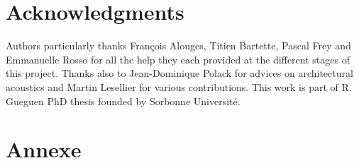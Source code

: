 \documentclass[AMA,STIX1COL]{WileyNJD-v2}
\begin{document}
\section*{Acknowledgments}
Authors particularly thanks Fran\c{c}ois Alouges, Titien Bartette, Pascal Frey and Emmanuelle Rosso for all the help they each provided at the different stages of this project. Thanks also to Jean-Dominique Polack for advices on architectural acoustics and Martin Lesellier for various contributions. This work is part of R. Gueguen PhD thesis founded by Sorbonne Universit\'e.

%

\clearpage

\section*{Annexe}
\end{document}
